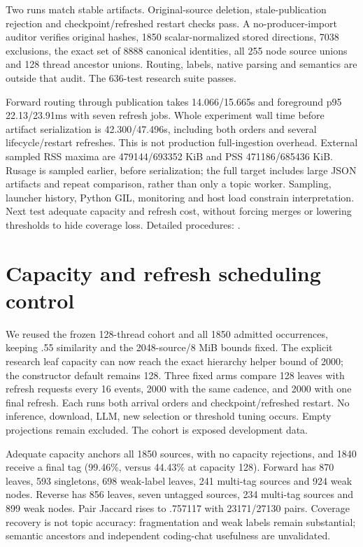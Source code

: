 \documentclass[11pt]{article}
\begin{document}
Two runs match stable artifacts. Original-source deletion, stale-publication
rejection and checkpoint/refreshed restart checks pass. A no-producer-import
auditor verifies original hashes, 1850 scalar-normalized stored directions,
7038 exclusions, the exact set of 8888 canonical identities, all 255 node
source unions and 128 thread ancestor unions. Routing, labels, native parsing
and semantics are outside that audit. The 636-test research suite passes.

Forward routing through publication takes 14.066/15.665s and foreground p95
22.13/23.91ms with seven refresh jobs. Whole experiment wall time before
artifact serialization is 42.300/47.496s, including both orders and several
lifecycle/restart refreshes. This is not production full-ingestion overhead.
External sampled RSS maxima are 479144/693352 KiB and PSS 471186/685436 KiB.
Rusage is sampled earlier, before serialization; the full target includes
large JSON artifacts and repeat comparison, rather than only a topic worker.
Sampling, launcher history, Python GIL, monitoring and host load constrain
interpretation. Next test adequate capacity and refresh cost, without forcing
merges or lowering thresholds to hide coverage loss. Detailed procedures:
.

\section{Capacity and refresh scheduling control}
We reused the frozen 128-thread cohort and all 1850 admitted occurrences,
keeping .55 similarity and the 2048-source/8 MiB bounds fixed. The explicit
research leaf capacity can now reach the exact hierarchy helper bound of 2000;
the constructor default remains 128. Three fixed arms compare 128 leaves with
refresh requests every 16 events, 2000 with the same cadence, and 2000 with
one final refresh. Each runs both arrival orders and checkpoint/refreshed
restart. No inference, download, LLM, new selection or threshold tuning occurs.
Empty projections remain excluded. The cohort is exposed development data.

Adequate capacity anchors all 1850 sources, with no capacity rejections, and
1840 receive a final tag (99.46\%, versus 44.43\% at capacity 128). Forward
has 870 leaves, 593 singletons, 698 weak-label leaves, 241 multi-tag sources
and 924 weak nodes. Reverse has 856 leaves, seven untagged sources, 234
multi-tag sources and 899 weak nodes. Pair Jaccard rises to .757117 with
23171/27130 pairs. Coverage recovery is not topic accuracy: fragmentation and
weak labels remain substantial; semantic ancestors and independent coding-chat
usefulness are unvalidated.
\end{document}
